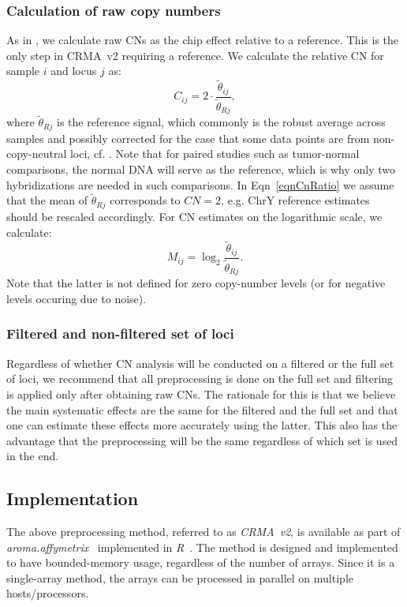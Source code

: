 \documentclass{bioinfo}
\newcommand{\pkg}[1]{\textit{#1}\xspace}
\newcommand{\CN}{CN\xspace}
\begin{document}
\subsubsection{Calculation of raw copy numbers}
\label{secRawCN}
As in \citet{BengtssonH_etal_2008}, we calculate raw CNs as the chip effect relative to a reference.  This is the only step in CRMA~v2 requiring a reference.
We calculate the relative \CN for sample $i$ and locus $j$ as:
\begin{equation}
  C_{ij} = 2 \cdot \frac{\tilde\theta_{ij}}{\tilde\theta_{Rj}},
  \label{eqnCnRatio}
\end{equation}
where $\tilde\theta_{Rj}$ is the reference signal, which commonly is the robust average across samples and possibly corrected for the case that some data points are from non-copy-neutral loci, cf. \citet{BengtssonH_etal_2008}.
Note that for paired studies such as tumor-normal comparisons, the normal DNA will serve as the reference, which is why only two hybridizations are needed in such comparisons.
In Eqn~\eqref{eqnCnRatio} we assume that the mean of $\tilde\theta_{Rj}$ corresponds to $\CN=2$, e.g. ChrY reference estimates should be rescaled accordingly.
For \CN estimates on the logarithmic scale, we calculate:
\begin{equation}
  M_{ij} = \log_2 \frac{\tilde\theta_{ij}}{\tilde\theta_{Rj}}.
  \label{eqnCnLogRatio}
\end{equation}
Note that the latter is not defined for zero copy-number levels (or for negative levels occuring due to noise).


\subsubsection{Filtered and non-filtered set of loci}
Regardless of whether CN analysis will be conducted on a filtered or the full set of loci, we recommend that all preprocessing is done on the full set and filtering is applied only after obtaining raw CNs.  %
The rationale for this is that we believe the main systematic effects are the same for the filtered and the full set and that one can estimate these effects more accurately using the latter.
This also has the advantage that the preprocessing will be the same regardless of which set is used in the end.


\subsection{Implementation}
The above preprocessing method, referred to as \emph{CRMA~v2}, is available as part of \pkg{aroma.affymetrix}~\citep{BengtssonH_etal_2008b} implemented in \pkg{R}~\citep{RDevel_2008}.
The method is designed and implemented to have bounded-memory usage, regardless of the number of arrays.
Since it is a single-array method, the arrays can be processed in parallel on multiple hosts/processors.
\end{document}
